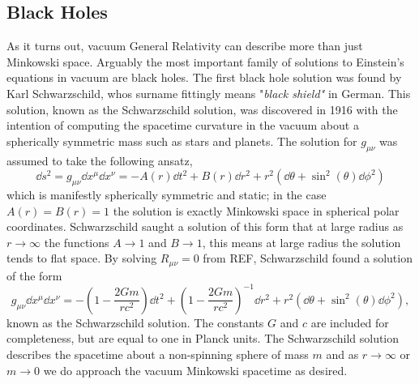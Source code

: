 \subsection{Black Holes}\label{intro:sec:bh_theory}
 As it turns out, vacuum General Relativity can describe more than just Minkowski space. Arguably the most important family of solutions to Einstein's equations in vacuum are black holes. The first black hole solution was found by Karl Schwarzschild, whos surname fittingly means {"\it black shield"} in German. This solution, known as the Schwarzschild solution, was discovered in 1916 with the intention of computing the spacetime curvature in the vacuum about a spherically symmetric mass such as stars and planets. The solution for $g_{\mu\nu}$ was assumed to take the following ansatz,
 \begin{equation} \label{intro:eq:sc_ansatz}
\dd s^2 = g_{\mu\nu} \dd x^\mu \dd x^\nu= -A(r) \dd t^2 + B(r) \dd r^2 + r^2 \left(\dd \theta + \sin^2(\theta) \dd \phi^2\right)
 \end{equation}
which is manifestly spherically symmetric and static; in the case $A(r)=B(r)=1$ the solution is exactly Minkowski space in spherical polar coordinates. Schwarzschild saught a solution of this form that at large radius as $r\rightarrow \infty$ the functions $A\rightarrow 1$ and $B\rightarrow 1$, this means at large radius the solution tends to flat space. By solving $R_{\mu\nu} = 0$ from REF, Schwarzschild found a solution of the form
 \begin{equation}
 g_{\mu\nu} \dd x^\mu \dd x^\nu= -\left(1-\frac{2Gm}{rc^2}\right) \dd t^2 + \left(1-\frac{2Gm}{rc^2}\right)^{-1} \dd r^2 + r^2 \left(\dd \theta + \sin^2(\theta) \dd \phi^2\right),
 \end{equation}
known as the Schwarzschild solution. The constants $G$ and $c$ are included for completeness, but are equal to one in Planck units. The Schwarzschild solution describes the spacetime about a non-spinning sphere of mass $m$ and as $r\rightarrow \infty$ or $m\rightarrow 0$ we do approach the vacuum Minkowski spacetime as desired. 


